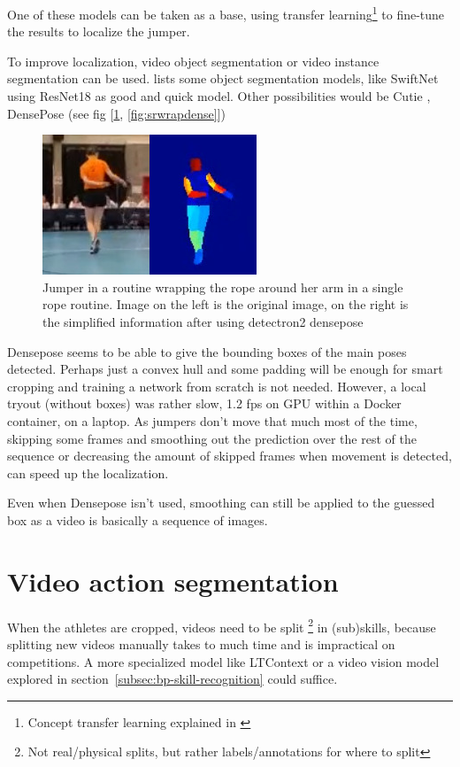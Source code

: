 One of these models can be taken as a base, using transfer learning\footnote{Concept transfer learning explained in \autocite{Bharadiya_2023}} to fine-tune the results to localize the jumper.

To improve localization, video object segmentation or video instance segmentation can be used. \textcite{Gao_2022} lists some object segmentation models, like SwiftNet \textcite{Wang_2021} using ResNet18 as good and quick model.
Other possibilities would be Cutie \autocite{Cheng_2023}, DensePose (see fig [\ref{fig:srwrap}, \ref{fig:srwrapdense}]) \autocite{Guler_2018}

\begin{figure}
    \centering
    \includegraphics[width=0.3\linewidth]{../graphics/sr-denseposed}
    \caption{Jumper in a routine wrapping the rope around her arm in a single rope routine. Image on the left is the original image, on the right is the simplified information after using detectron2 densepose \autocite{wu2019detectron2}}
    \label{fig:srwrap}
\end{figure}

Densepose seems to be able to give the bounding boxes of the main poses detected. Perhaps just a convex hull and some padding will be enough for smart cropping and training a network from scratch is not needed.
However, a local tryout (without boxes) was rather slow, 1.2 fps on GPU within a Docker container, on a laptop.
As jumpers don’t move that much most of the time, skipping some frames and smoothing out the prediction over the rest of the sequence or decreasing the amount of skipped frames when movement is detected, can speed up the localization.

Even when Densepose isn’t used, smoothing can still be applied to the guessed box as a video is basically a sequence of images.

\section{Video action segmentation}

When the athletes are cropped, videos need to be split \footnote{Not real/physical splits, but rather labels/annotations for where to split} in (sub)skills, because splitting new videos manually takes to much time and is impractical on competitions. A more specialized model like LTContext \autocite{Jiaming_2023} or a video vision model explored in section~\ref{subsec:bp-skill-recognition} could suffice.

